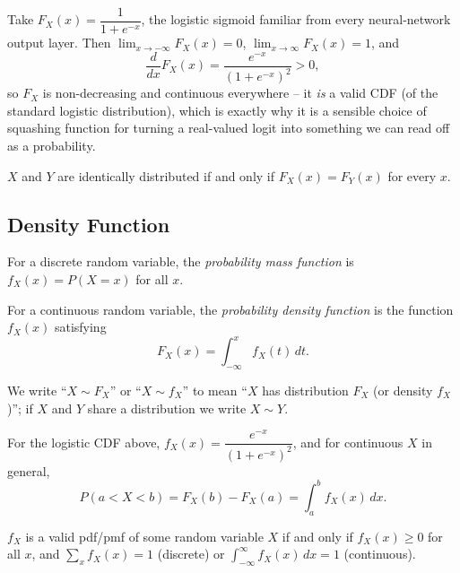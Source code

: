 \documentclass[11pt]{article}
\begin{document}
\begin{example}
Take $F_X(x) = \dfrac{1}{1+e^{-x}}$, the logistic sigmoid familiar from every
neural-network output layer. Then $\lim_{x\to-\infty}F_X(x)=0$,
$\lim_{x\to\infty}F_X(x)=1$, and
\[
  \frac{d}{dx}F_X(x) = \frac{e^{-x}}{(1+e^{-x})^2} > 0,
\]
so $F_X$ is non-decreasing and continuous everywhere -- it \emph{is} a valid
CDF (of the standard logistic distribution), which is exactly why it is a
sensible choice of squashing function for turning a real-valued logit into
something we can read off as a probability.
\end{example}

\begin{theorem}
$X$ and $Y$ are identically distributed if and only if $F_X(x) = F_Y(x)$ for
every $x$.
\end{theorem}

\subsection{Density Function}

\begin{definition}[pmf]
For a discrete random variable, the \emph{probability mass function} is
$f_X(x) = P(X = x)$ for all $x$.
\end{definition}

\begin{definition}[pdf]
For a continuous random variable, the \emph{probability density function} is
the function $f_X(x)$ satisfying
\[
  F_X(x) = \int_{-\infty}^x f_X(t)\, dt.
\]
\end{definition}

We write ``$X \sim F_X$'' or ``$X \sim f_X$'' to mean ``$X$ has distribution
$F_X$ (or density $f_X$)''; if $X$ and $Y$ share a distribution we write
$X \sim Y$.

\begin{example}
For the logistic CDF above, $f_X(x) = \dfrac{e^{-x}}{(1+e^{-x})^2}$, and for
continuous $X$ in general,
\[
  P(a < X < b) = F_X(b) - F_X(a) = \int_a^b f_X(x)\,dx.
\]
\end{example}

\begin{theorem}
$f_X$ is a valid pdf/pmf of some random variable $X$ if and only if
$f_X(x) \ge 0$ for all $x$, and $\sum_x f_X(x) = 1$ (discrete) or
$\int_{-\infty}^\infty f_X(x)\,dx = 1$ (continuous).
\end{theorem}
\end{document}
